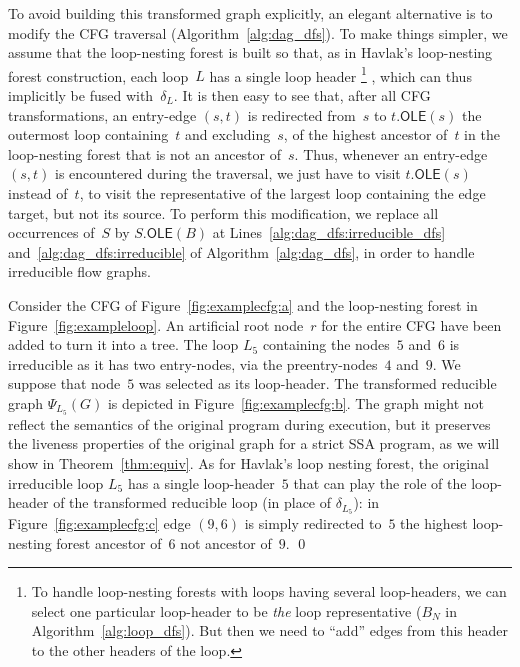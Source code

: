\newcommand{\OLE}[2]{#1.\textsf{OLE}(#2)}

To avoid building this transformed graph explicitly, an elegant alternative is to modify the CFG traversal (Algorithm~\ref{alg:dag_dfs}).
To make things simpler, we assume that the loop-nesting forest is built so that, as in Havlak's loop-nesting forest construction, each loop~$L$ has a single loop header%
\footnote{%
	To handle loop-nesting forests with loops having several loop-headers, we can select one particular loop-header to be \emph{the} loop representative ($B_N$ in Algorithm~\ref{alg:loop_dfs}).
	But then we need to ``add'' edges from this header to the other headers of the loop.
}
, which can thus implicitly be fused with~$\delta_L$.
It is then easy to see that, after all CFG transformations, an entry-edge $(s,t)$ is redirected from~$s$ to $\OLE{t}{s}$ the outermost loop containing~$t$ and excluding~$s$, \ie of the highest ancestor of~$t$ in the loop-nesting forest that is not an ancestor of~$s$.
Thus, whenever an entry-edge $(s,t)$ is encountered during the traversal, we just have to visit $\OLE{t}{s}$ instead of~$t$, \ie to visit the representative of the largest loop containing the edge target, but not its source.
To perform this modification, we replace all occurrences of~$S$ by $\OLE{S}{B}$ at Lines~\ref{alg:dag_dfs:irreducible_dfs} and~\ref{alg:dag_dfs:irreducible} of Algorithm~\ref{alg:dag_dfs}, in order to handle irreducible flow graphs.


\begin{example}
	Consider the CFG of Figure~\ref{fig:examplecfg:a} and the loop-nesting forest in Figure~\ref{fig:exampleloop}.
	An artificial root node~$r$ for the entire CFG have been added to turn it into a tree.
	The loop $L_5$ containing the nodes~$5$ and~$6$ is irreducible as it has two entry-nodes, via the preentry-nodes~$4$ and~$9$.
	We suppose that node~$5$ was selected as its loop-header.
	The transformed reducible graph $\Psi_{L_5}(G)$ is depicted in Figure~\ref{fig:examplecfg:b}.
	The graph might not reflect the semantics of the original program during execution, but it preserves the liveness properties of the original graph for a strict SSA program, as we will show in Theorem~\ref{thm:equiv}.
	As for Havlak's loop nesting forest, the original irreducible loop $L_5$ has a single loop-header~$5$ that can play the role of the loop-header of the transformed reducible loop (in place of $\delta_{L_5}$):
	in Figure~\ref{fig:examplecfg:c} edge $(9,6)$ is simply redirected to~$5$ the highest loop-nesting forest ancestor of~$6$ not ancestor of~$9$.
	\qed
\end{example}

